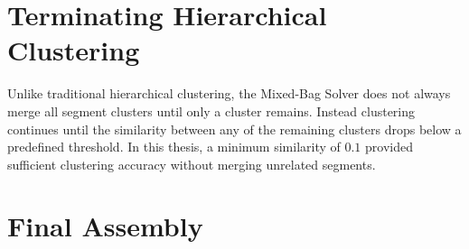 \section{Terminating Hierarchical Clustering}

Unlike traditional hierarchical clustering, the Mixed-Bag Solver does not always merge all segment clusters  until only a cluster remains. Instead clustering continues until the similarity between any of the remaining clusters drops below a predefined threshold.  In this thesis, a minimum similarity of $0.1$ provided sufficient clustering accuracy without merging unrelated segments.

\section{Final Assembly}